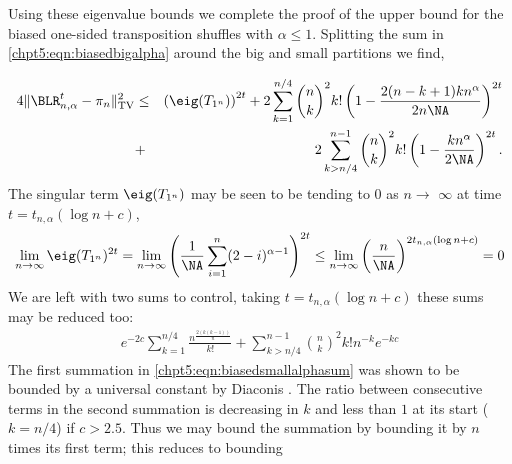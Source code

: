 \documentclass[11pt]{report}
\begin{document}
Using these eigenvalue bounds we complete the proof of the upper bound for the biased one-sided transposition shuffles with $\alpha \leq 1$. Splitting the sum in \eqref{chpt5:eqn:biasedbigalpha} around the big and small partitions we find,



\begin{eqnarray}
4\lVert \BLR_{n,\alpha}^{t} - \pi_{n} \rVert^{2}_{\tiny \textnormal{TV}} 
&\leq &  \left(\eig(T_{1^{n}})\right)^{2t} + 2\sum_{k=1}^{n/4} 
{n\choose k}^{2} k!	\left(1 - 
\frac{2(n-k+1)kn^{\alpha}}{2n\NA}\right)^{2t} \nonumber\\ &+& 
2\sum_{k>n/4}^{n-1} {n\choose k}^{2} k!
\left( 1 - 	\frac{kn^{\alpha}}{2\NA}\right)^{2t}. \nonumber
\end{eqnarray}
The singular term $\eig(T_{1^{n}})$ may be seen to be tending to $0$ as $n\to$ $\infty$ at time $t=t_{n,\alpha}(\log n  +  c)$,
\[\lim_{n\to\infty} \eig(T_{1^{n}})^{2t} = \lim_{n\to\infty}\left(\frac{1}{\NA} \sum_{i=1}^{n} (2-i)^{\alpha-1} \right)^{2t} \leq\lim_{n\to\infty} \left( \frac{n}{\NA}\right)^{2t_{n,\alpha}(\log n  +c)} = 0\]
We are left with two sums to control, taking $t = t_{n,\alpha} (\log n + c)$ these sums may be reduced too:
\begin{eqnarray}
e^{-2c}\sum_{k=1}^{n/4}  \frac{n^{\frac{2(k(k-1))}{n}}}{k!} + \sum_{k>n/4}^{n-1} {n\choose k}^{2} k! n^{-k} e^{-k c}
\label{chpt5:eqn:biasedsmallalphasum}
\end{eqnarray}
The first summation in \eqref{chpt5:eqn:biasedsmallalphasum} was shown to be bounded by a universal constant by Diaconis \cite[Chapter 3D Theorem 5]{Diaconis1988}. The ratio between consecutive terms in the  second summation is decreasing in $k$ and less than $1$ at its start ($k=n/4$) if $c>2.5$. Thus we may bound the summation by bounding it by $n$ times its first term; this reduces to bounding
\end{document}
